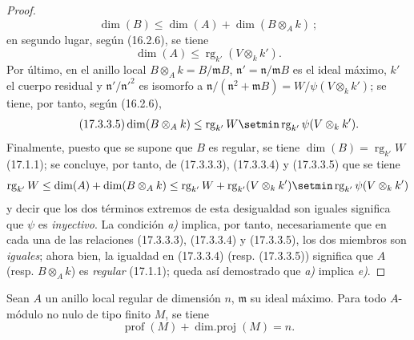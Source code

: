 \begin{proof}
\begin{equation}
\tag{17.3.3.3}
  \dim(B)\leq\dim(A)+\dim(B\otimes_A k)~;
\end{equation}
en segundo lugar, según (16.2.6), se tiene
\begin{equation}
\label{0.17.3.3.4-fr}
\tag{17.3.3.4}
  \dim(A)\leq\operatorname{rg}_{k'}(V\otimes_k k').
\end{equation}
Por último, en el anillo local $B\otimes_A k=B/\mathfrak{m}B$,
$\mathfrak{n}'=\mathfrak{n}/\mathfrak{m}B$ es el ideal máximo, $k'$ el cuerpo
residual y $\mathfrak{n}'/\mathfrak{n}'^2$ es isomorfo a
$\mathfrak{n}/(\mathfrak{n}^2+\mathfrak{m}B)
=W/\psi(V\otimes_k k')$; se tiene, por tanto, según (16.2.6),
\begin{equation}
\label{0.17.3.3.5-fr}
\tag{17.3.3.5}
  \dim(B\otimes_A k)
  \leq\operatorname{rg}_{k'}W
  \setmin\operatorname{rg}_{k'}\psi(V\otimes_k k').
\end{equation}
Finalmente, puesto que se supone que $B$ es regular, se tiene
$\dim(B)=\operatorname{rg}_{k'}W$ (17.1.1); se concluye, por tanto, de
(17.3.3.3), (17.3.3.4) y (17.3.3.5) que se tiene
\[
  \operatorname{rg}_{k'}W
  \leq\dim(A)+\dim(B\otimes_A k)
  \leq\operatorname{rg}_{k'}W
  +\operatorname{rg}_{k'}(V\otimes_k k')
  \setmin\operatorname{rg}_{k'}\psi(V\otimes_k k')
\]
y decir que los dos términos extremos de esta desigualdad son iguales
significa que $\psi$ es \emph{inyectivo}. La condición \emph{a)} implica, por tanto,
necesariamente que en cada una de las relaciones (17.3.3.3), (17.3.3.4) y
(17.3.3.5), los dos miembros son \emph{iguales}; ahora bien, la igualdad en
(17.3.3.4) (resp. (17.3.3.5)) significa que $A$ (resp. $B\otimes_A k$) es
\emph{regular} (17.1.1); queda así demostrado que \emph{a)} implica \emph{e)}.
\end{proof}

\begin{proposition}[17.3.4]
\label{0.17.3.4-fr}
Sean $A$ un anillo local regular de dimensión $n$, $\mathfrak{m}$ su ideal
máximo. Para todo $A$-módulo no nulo de tipo finito $M$, se tiene
\begin{equation}
\label{0.17.3.4.1-fr}
\tag{17.3.4.1}
  \operatorname{prof}(M)+\operatorname{dim.proj}(M)=n.
\end{equation}
\end{proposition}

